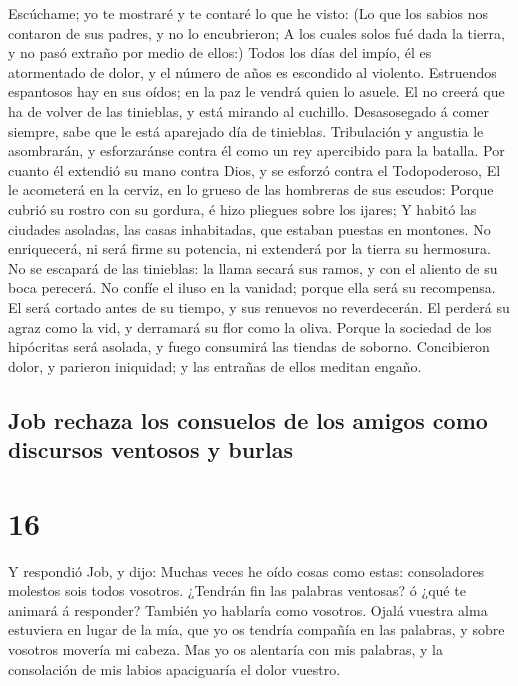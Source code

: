  Escúchame; yo te mostraré y te contaré lo que he visto:
 (Lo que los sabios nos contaron de sus padres, y no lo
encubrieron;  A los cuales solos fué dada la tierra, y no
pasó extraño por medio de ellos:)  Todos los días del
impío, él es atormentado de dolor, y el número de años es escondido al
violento.  Estruendos espantosos hay en sus oídos; en la
paz le vendrá quien lo asuele.  El no creerá que ha de
volver de las tinieblas, y está mirando al cuchillo. 
Desasosegado á comer siempre, sabe que le está aparejado día de
tinieblas.  Tribulación y angustia le asombrarán, y
esforzaránse contra él como un rey apercibido para la batalla.
 Por cuanto él extendió su mano contra Dios, y se esforzó
contra el Todopoderoso,  El le acometerá en la cerviz, en
lo grueso de las hombreras de sus escudos:  Porque cubrió
su rostro con su gordura, é hizo pliegues sobre los ijares;
 Y habitó las ciudades asoladas, las casas inhabitadas, que
estaban puestas en montones.  No enriquecerá, ni será firme
su potencia, ni extenderá por la tierra su hermosura.  No
se escapará de las tinieblas: la llama secará sus ramos, y con el
aliento de su boca perecerá.  No confíe el iluso en la
vanidad; porque ella será su recompensa.  El será cortado
antes de su tiempo, y sus renuevos no reverdecerán.  El
perderá su agraz como la vid, y derramará su flor como la oliva.
 Porque la sociedad de los hipócritas será asolada, y fuego
consumirá las tiendas de soborno.  Concibieron dolor, y
parieron iniquidad; y las entrañas de ellos meditan engaño.

\hypertarget{job-rechaza-los-consuelos-de-los-amigos-como-discursos-ventosos-y-burlas}{%
\subsection{Job rechaza los consuelos de los amigos como discursos
ventosos y
burlas}\label{job-rechaza-los-consuelos-de-los-amigos-como-discursos-ventosos-y-burlas}}

\hypertarget{section-15}{%
\section{16}\label{section-15}}

 Y respondió Job, y dijo:  Muchas veces he oído
cosas como estas: consoladores molestos sois todos vosotros.
 ¿Tendrán fin las palabras ventosas? ó ¿qué te animará á
responder?  También yo hablaría como vosotros. Ojalá vuestra
alma estuviera en lugar de la mía, que yo os tendría compañía en las
palabras, y sobre vosotros movería mi cabeza.  Mas yo os
alentaría con mis palabras, y la consolación de mis labios apaciguaría
el dolor vuestro.


